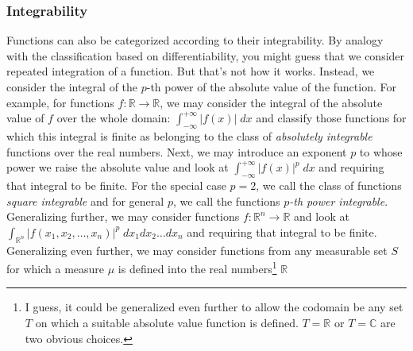 \subsubsection{Integrability} Functions can also be categorized according to their integrability. By analogy with the classification based on differentiability, you might guess that we consider repeated integration of a function. But that's not how it works. Instead, we consider the integral of the $p$-th power of the absolute value of the function. For example, for functions $f: \mathbb{R} \rightarrow \mathbb{R}$, we may consider the integral of the absolute value of $f$ over the whole domain: $\int_{-\infty}^{+\infty} |f(x)| \; dx$ and classify those functions for which this integral is finite as belonging to the class of \emph{absolutely integrable} functions over the real numbers. Next, we may introduce an exponent $p$ to whose power we raise the absolute value and look at $\int_{-\infty}^{+\infty} |f(x)|^p \; dx$ and requiring that integral to be finite. For the special case $p=2$, we call the class of functions \emph{square integrable} and for general $p$, we call the functions \emph{$p$-th power integrable}. Generalizing further, we may consider functions $f: \mathbb{R}^n \rightarrow \mathbb{R}$ and look at $\int_{\mathbb{R}^n} |f(x_1, x_2,\ldots,x_n)|^p \; dx_1 dx_2 \ldots dx_n$ and requiring that integral to be finite. Generalizing even further, we may consider functions from any measurable set $S$ for which a measure $\mu$ is defined into the real numbers\footnote{I guess, it could be generalized even further to allow the codomain be any set $T$ on which a suitable absolute value function is defined. $T =\mathbb{R}$ or $T = \mathbb{C}$ are two obvious choices.} $\mathbb{R}$






